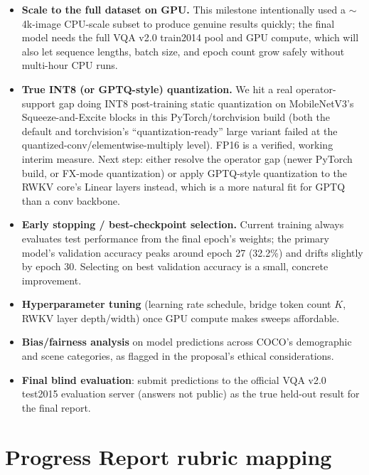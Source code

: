 \documentclass[final]{article}
\begin{document}
\begin{itemize}
  \item \textbf{Scale to the full dataset on GPU.} This milestone intentionally used a $\sim$4k-image CPU-scale subset to produce genuine results quickly; the final model needs the full VQA v2.0 train2014 pool and GPU compute, which will also let sequence lengths, batch size, and epoch count grow safely without multi-hour CPU runs.
  \item \textbf{True INT8 (or GPTQ-style) quantization.} We hit a real operator-support gap doing INT8 post-training static quantization on MobileNetV3's Squeeze-and-Excite blocks in this PyTorch/torchvision build (both the default and torchvision's ``quantization-ready'' large variant failed at the quantized-conv/elementwise-multiply level). FP16 is a verified, working interim measure. Next step: either resolve the operator gap (newer PyTorch build, or FX-mode quantization) or apply GPTQ-style quantization to the RWKV core's Linear layers instead, which is a more natural fit for GPTQ than a conv backbone.
  \item \textbf{Early stopping / best-checkpoint selection.} Current training always evaluates test performance from the final epoch's weights; the primary model's validation accuracy peaks around epoch 27 (32.2\%) and drifts slightly by epoch 30. Selecting on best validation accuracy is a small, concrete improvement.
  \item \textbf{Hyperparameter tuning} (learning rate schedule, bridge token count $K$, RWKV layer depth/width) once GPU compute makes sweeps affordable.
  \item \textbf{Bias/fairness analysis} on model predictions across COCO's demographic and scene categories, as flagged in the proposal's ethical considerations.
  \item \textbf{Final blind evaluation}: submit predictions to the official VQA v2.0 test2015 evaluation server (answers not public) as the true held-out result for the final report.
\end{itemize}

\section*{Progress Report rubric mapping}
\end{document}
